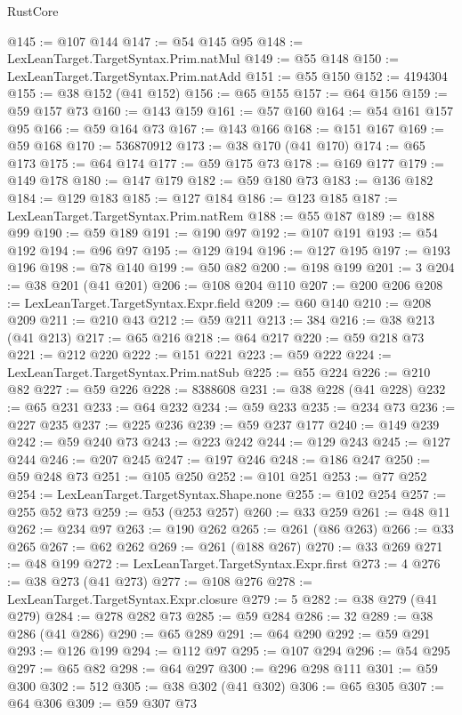 \begin{lexlean}{RustCore}
\begin{coremodule}
@145 := @107 @144
@147 := @54 @145 @95
@148 := LexLeanTarget.TargetSyntax.Prim.natMul
@149 := @55 @148
@150 := LexLeanTarget.TargetSyntax.Prim.natAdd
@151 := @55 @150
@152 := 4194304
@155 := @38 @152 (@41 @152)
@156 := @65 @155
@157 := @64 @156
@159 := @59 @157 @73
@160 := @143 @159
@161 := @57 @160
@164 := @54 @161 @157 @95
@166 := @59 @164 @73
@167 := @143 @166
@168 := @151 @167
@169 := @59 @168
@170 := 536870912
@173 := @38 @170 (@41 @170)
@174 := @65 @173
@175 := @64 @174
@177 := @59 @175 @73
@178 := @169 @177
@179 := @149 @178
@180 := @147 @179
@182 := @59 @180 @73
@183 := @136 @182
@184 := @129 @183
@185 := @127 @184
@186 := @123 @185
@187 := LexLeanTarget.TargetSyntax.Prim.natRem
@188 := @55 @187
@189 := @188 @99
@190 := @59 @189
@191 := @190 @97
@192 := @107 @191
@193 := @54 @192
@194 := @96 @97
@195 := @129 @194
@196 := @127 @195
@197 := @193 @196
@198 := @78 @140
@199 := @50 @82
@200 := @198 @199
@201 := 3
@204 := @38 @201 (@41 @201)
@206 := @108 @204 @110
@207 := @200 @206
@208 := LexLeanTarget.TargetSyntax.Expr.field
@209 := @60 @140
@210 := @208 @209
@211 := @210 @43
@212 := @59 @211
@213 := 384
@216 := @38 @213 (@41 @213)
@217 := @65 @216
@218 := @64 @217
@220 := @59 @218 @73
@221 := @212 @220
@222 := @151 @221
@223 := @59 @222
@224 := LexLeanTarget.TargetSyntax.Prim.natSub
@225 := @55 @224
@226 := @210 @82
@227 := @59 @226
@228 := 8388608
@231 := @38 @228 (@41 @228)
@232 := @65 @231
@233 := @64 @232
@234 := @59 @233
@235 := @234 @73
@236 := @227 @235
@237 := @225 @236
@239 := @59 @237 @177
@240 := @149 @239
@242 := @59 @240 @73
@243 := @223 @242
@244 := @129 @243
@245 := @127 @244
@246 := @207 @245
@247 := @197 @246
@248 := @186 @247
@250 := @59 @248 @73
@251 := @105 @250
@252 := @101 @251
@253 := @77 @252
@254 := LexLeanTarget.TargetSyntax.Shape.none
@255 := @102 @254
@257 := @255 @52 @73
@259 := @53 (@253 @257)
@260 := @33 @259
@261 := @48 @11
@262 := @234 @97
@263 := @190 @262
@265 := @261 (@86 @263)
@266 := @33 @265
@267 := @62 @262
@269 := @261 (@188 @267)
@270 := @33 @269
@271 := @48 @199
@272 := LexLeanTarget.TargetSyntax.Expr.first
@273 := 4
@276 := @38 @273 (@41 @273)
@277 := @108 @276
@278 := LexLeanTarget.TargetSyntax.Expr.closure
@279 := 5
@282 := @38 @279 (@41 @279)
@284 := @278 @282 @73
@285 := @59 @284
@286 := 32
@289 := @38 @286 (@41 @286)
@290 := @65 @289
@291 := @64 @290
@292 := @59 @291
@293 := @126 @199
@294 := @112 @97
@295 := @107 @294
@296 := @54 @295
@297 := @65 @82
@298 := @64 @297
@300 := @296 @298 @111
@301 := @59 @300
@302 := 512
@305 := @38 @302 (@41 @302)
@306 := @65 @305
@307 := @64 @306
@309 := @59 @307 @73

\end{coremodule}
\end{lexlean}
